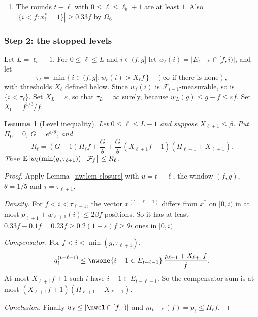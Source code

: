 \documentclass[11pt]{amsart}
\newtheorem{lemma}[theorem]{Lemma}
\theoremstyle{definition}
\theoremstyle{remark}
\newcommand{\eps}{\varepsilon}
\newcommand{\EE}{\mathbb{E}}
\newcommand{\cF}{\mathcal{F}}
\begin{document}
\begin{enumerate}[label=(P\arabic*),leftmargin=*]
\begin{itemize}
  \item \emph{Not empty.} $\Pi_2\le\sqrt{\lambda\Pi_1}\le\beta$ for
    $f\ge e^{200}$. Hence $t\ge3$ and $\ell_b\ge1$.
  \item \emph{Depth bound (a).} From
    $\Pi_1^{2^{-\ell_b}}\le\Pi_{\ell_b+1}\le\beta$ we get
    $2^{-\ell_b}\ln(1/\Pi_1)\ge\ln20$.
  \item \emph{Depth bound (b).} From
    \[
      225(\Pi_1/225)^{2^{-\ell_b}}\le\Pi_{\ell_b+1}\le1/20
    \]
    we get $2^{-\ell_b}\ln(225/\Pi_1)\ge\ln4500$. Since
    \[
      \ln(225/\Pi_1)=\ln45+\tfrac12\ln f-\tfrac12\ln\ln f,
    \]
    we obtain
    \[
      2^{\ell_b}\le\frac{\ln(225/\Pi_1)}{\ln4500}\le\frac{\ln f}{16}
      \qquad(\ln f\ge151).
    \]
  \end{itemize}
\item The rounds $t-\ell$ with $0\le\ell\le\ell_b+1$ are at least $1$. Also
  $|\{i<f:x^*_i=1\}|\ge0.33f$ by $\Omega_6$.
\end{enumerate}

\subsubsection{Step 2: the stopped levels}
Let $L=\ell_b+1$. For $0\le\ell\le L$ and $i\in(f,g]$ let
$w_\ell(i)=|E_{t-\ell}\cap[f,i)|$, and let
\[
  \tau_\ell=\min\{\,i\in(f,g]:w_\ell(i)>X_\ell f\,\}\quad
  (\infty\text{ if there is none}),
\]
with thresholds $X_\ell$ defined below. Since $w_\ell(i)$ is
$\cF_{i-1}$-measurable, so is $\{i<\tau_\ell\}$. Set $X_L=\eps$, so that
$\tau_L=\infty$ surely, because $w_L(g)\le g-f\le\eps f$. Set
$X_0=f^{1/3}/f$.

\begin{lemma}[Level inequality]\label{nw:lem-level}
Let $0\le\ell\le L-1$ and suppose $X_{\ell+1}\le\beta$. Put $\Pi_0=0$,
$G=e^{\eps/\theta}$, and
\[
  R_\ell=(G-1)\Pi_\ell f+\frac G\theta
  +\frac G\theta\,(X_{\ell+1}f+1)(\Pi_{\ell+1}+X_{\ell+1}).
\]
Then $\EE\bigl[w_\ell(\min(g,\tau_{\ell+1}))\bigm|\cF_f\bigr]\le R_\ell$.
\end{lemma}

\begin{proof}
Apply Lemma~\ref{nw:lem-closure} with $u=t-\ell$, the window $(f,g)$,
$\theta=1/5$ and $\tau=\tau_{\ell+1}$.

\emph{Density.} For $f<i<\tau_{\ell+1}$, the vector $x^{(t-\ell-1)}$ differs
from $x^*$ on $[0,i)$ in at most $p_{\ell+1}+w_{\ell+1}(i)\le2\beta f$
positions. So it has at least $0.33f-0.1f=0.23f\ge0.2(1+\eps)f\ge\theta i$
ones in $[0,i)$.

\emph{Compensator.} For $f<i<\min(g,\tau_{\ell+1})$,
\[
  q^{(t-\ell-1)}_i\le\nwone\{i-1\in E_{t-\ell-1}\}\,
  \frac{p_{\ell+1}+X_{\ell+1}f}{f}.
\]
At most $X_{\ell+1}f+1$ such $i$ have $i-1\in E_{t-\ell-1}$. So the
compensator sum is at most $(X_{\ell+1}f+1)(\Pi_{\ell+1}+X_{\ell+1})$.

\emph{Conclusion.} Finally $w_\ell\le|\nwcl\cap[f,\cdot)|$ and
$m_{t-\ell}(f)=p_\ell\le\Pi_\ell f$.
\end{proof}
\end{document}
